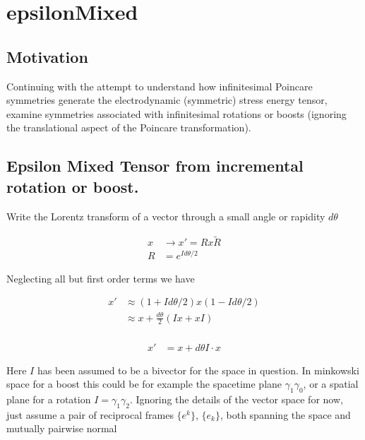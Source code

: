 

\chapter{epsilonMixed}
\label{chap:epsilonMixed}
\date{July 14, 2009}

\beginArtWithToc

\section{Motivation}

Continuing with the attempt to understand how infinitesimal Poincare
symmetries generate the electrodynamic (symmetric) stress energy
tensor, examine symmetries associated with infinitesimal rotations 
or boosts (ignoring the translational aspect of the Poincare transformation).

\section{Epsilon Mixed Tensor from incremental rotation or boost.}

Write the Lorentz transform of a vector through a small angle or rapidity $d\theta$

\begin{align*}
x &\rightarrow x' = R x \tilde{R} \\
R &= e^{I d\theta/2}
\end{align*}

Neglecting all but first order terms we have

\begin{align*}
x' 
&\approx (1 + Id\theta/2)x(1 - Id\theta/2) \\
&\approx x + \frac{d\theta}{2}(I x + x I) \\
\end{align*}

\begin{align}\label{eqn:incremental}
x' &= x + {d\theta} I \cdot x
\end{align}

Here $I$ has been assumed to be a bivector for the space in question.  In minkowski space for a boost this could be for example the spacetime plane $\gamma_1 \gamma_0$, or a spatial plane for a rotation $I = \gamma_1 \gamma_2$.  Ignoring the details of the vector space for now, just assume a pair of reciprocal frames $\{e^k\}$, $\{e_k\}$, both spanning the space and mutually pairwise
normal

